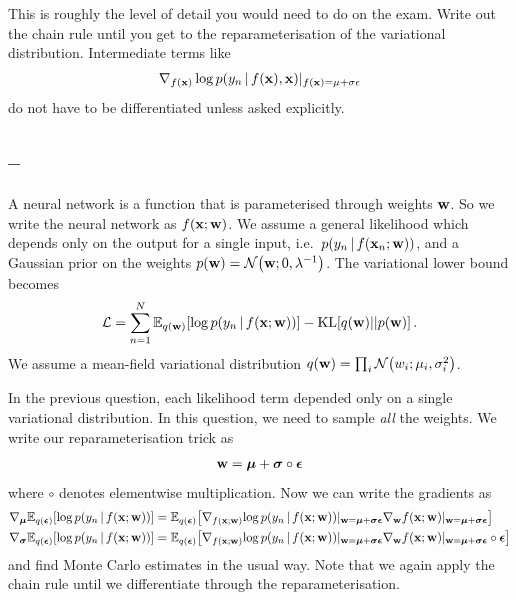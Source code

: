 \documentclass[a4paper]{article}
\newcommand{\questionref}[1]{\Cref{#1} -- \nameref{#1}}
\newcommand{\lb}{\mathcal{L}}
\newcommand{\sumn}{\sum_{n=1}^N}
\theoremstyle{definition}
\begin{document}
This is roughly the level of detail you would need to do on the exam. Write out the chain rule until you get to the reparameterisation of the variational distribution. Intermediate terms like 
\begin{align}
\nabla_{f(\mathbf{x})}\log p(y_n\,|\, f(\mathbf{x}), \mathbf{x}) \vert_{f(\mathbf{x}) = \mu+\sigma\epsilon}
\end{align}
 do not have to be differentiated unless asked explicitly.

\subsection{\questionref{q:bnn}}
A neural network is a function that is parameterised through weights $\mathbf{w}$. So we write the neural network as $f(\mathbf{x}; \mathbf{w})$. We assume a general likelihood which depends only on the output for a single input, i.e.~$p(y_n\,|\, f(\mathbf{x}_n; \mathbf{w}))$, and a Gaussian prior on the weights $p(\vw) = \NormDist{\vw; 0, \lambda\inv}$.
The variational lower bound becomes
\begin{align}
\lb = \sumn\Exp{q(\vw)}{\log p(y_n\given f(\vx; \vw))} - \KL{q(\vw)}{p(\vw)} \,.
\end{align}
We assume a mean-field variational distribution $q(\vw) = \prod_{i}\NormDist{w_i; \mu_i, \sigma_i^2}$.

In the previous question, each likelihood term depended only on a single variational distribution. In this question, we need to sample \emph{all} the weights. We write our reparameterisation trick as
\begin{align}
\mathbf{w} = \boldsymbol{\mu} + \boldsymbol{\sigma} \circ \boldsymbol{\epsilon} 
\end{align}
where $\circ$ denotes elementwise multiplication. Now we can write the gradients as
\begin{align}
\nabla_{\boldsymbol{\mu}}\Exp{q(\vepsilon)}{\log p(y_n\given f(\vx;\vw))} &= \Exp{q(\vepsilon)}{\nabla_{f(\vx; \vw)}\!\log p(y_n\given f(\vx; \vw))\vert_{\vw=\vmu+\boldsymbol{\sigma}\vepsilon}\nabla_{\vw}f(\vx;\vw)\vert_{\vw=\vmu+\boldsymbol\sigma\vepsilon}} \\
\nabla_{\boldsymbol{\sigma}}\Exp{q(\vepsilon)}{\log p(y_n\given f(\vx;\vw))} &= \Exp{q(\vepsilon)}{\nabla_{f(\vx; \vw)}\!\log p(y_n\given f(\vx; \vw))\vert_{\vw=\vmu+\boldsymbol\sigma\vepsilon}\nabla_{\vw}f(\vx;\vw)\vert_{\vw=\vmu+\boldsymbol\sigma\vepsilon} \circ \boldsymbol\vepsilon}
\end{align}
and find Monte Carlo estimates in the usual way. Note that we again apply the chain rule until we differentiate through the reparameterisation.
\end{document}
